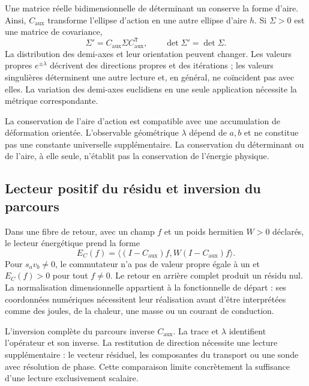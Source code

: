Une matrice réelle bidimensionnelle de déterminant un conserve la forme
d’aire. Ainsi, $C_{\mathrm{aux}}$ transforme l’ellipse
d’action en une autre ellipse d’aire $h$. Si $\Sigma>0$ est une matrice
de covariance,
\begin{equation}
 \Sigma'=C_{\mathrm{aux}}\Sigma C_{\mathrm{aux}}^{\mathsf T},
 \qquad \det\Sigma'=\det\Sigma.
 \label{md:aux:covarianza-area}
\end{equation}
La distribution des demi-axes et leur orientation peuvent changer.
Les valeurs propres $e^{\pm\lambda}$ décrivent des directions propres et des
itérations ; les valeurs singulières déterminent une autre lecture et, en
général, ne coïncident pas avec elles. La variation des demi-axes euclidiens
en une seule application nécessite la métrique correspondante.

La conservation de l’aire d’action est compatible avec une
accumulation de déformation orientée. L’observable géométrique
$\lambda$ dépend de $a,b$ et ne constitue pas une constante universelle
supplémentaire. La conservation du déterminant ou de l’aire, à elle
seule, n’établit pas la conservation de l’énergie physique.

\subsection{Lecteur positif du résidu et inversion du parcours}
\label{md:aux:residuo}

Dans une fibre de retour, avec un champ $f$ et un poids hermitien $W>0$
déclarés, le lecteur énergétique prend la forme
\begin{equation}
 E_C(f)=\langle(I-C_{\mathrm{aux}})f,
                  W(I-C_{\mathrm{aux}})f\rangle.
 \label{md:aux:energia-residuo}
\end{equation}
Pour $s_av_b\ne0$, le commutateur n’a pas de valeur propre égale à un et
$E_C(f)>0$ pour tout $f\ne0$. Le retour en arrière complet produit un résidu
nul. La normalisation dimensionnelle appartient à la fonctionnelle de
départ : ses coordonnées numériques nécessitent leur réalisation avant
d’être interprétées comme des joules, de la chaleur, une masse ou un courant de conduction.

L’inversion complète du parcours inverse $C_{\mathrm{aux}}$.
La trace et $\lambda$ identifient l’opérateur et son inverse. La
restitution de direction nécessite une lecture supplémentaire : le vecteur
résiduel, les composantes du transport ou une sonde avec résolution
de phase. Cette comparaison limite concrètement la suffisance
d’une lecture exclusivement scalaire.

